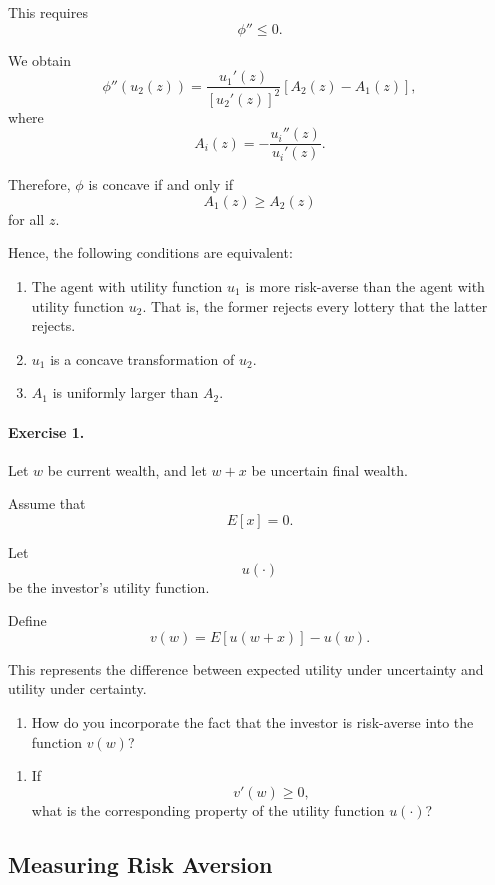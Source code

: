 This requires
\[
\phi''\le 0.
\]

We obtain
\[
\phi''(u_2(z))
=
\frac{u_1'(z)}{[u_2'(z)]^2}
\left[
A_2(z)-A_1(z)
\right],
\]
where
\[
A_i(z)
=
-\frac{u_i''(z)}{u_i'(z)}.
\]

Therefore, \(\phi\) is concave if and only if
\[
A_1(z)\ge A_2(z)
\]
for all \(z\).

Hence, the following conditions are equivalent:

\begin{enumerate}
    \item The agent with utility function \(u_1\) is more risk-averse than the agent with utility function \(u_2\). That is, the former rejects every lottery that the latter rejects.
    
    \item \(u_1\) is a concave transformation of \(u_2\).
    
    \item \(A_1\) is uniformly larger than \(A_2\).
\end{enumerate}

\paragraph{Exercise 1.}
Let \(w\) be current wealth, and let \(w+x\) be uncertain final wealth.

Assume that
\[
E[x]=0.
\]

Let
\[
u(\cdot)
\]
be the investor's utility function.

Define
\[
v(w)
=
E[u(w+x)]-u(w).
\]

This represents the difference between expected utility under uncertainty and utility under certainty.

\begin{enumerate}
    \item[(i)] How do you incorporate the fact that the investor is risk-averse into the function \(v(w)\)?
\end{enumerate}



\begin{enumerate}
    \item[(ii)] If
    \[
    v'(w)\ge 0,
    \]
    what is the corresponding property of the utility function \(u(\cdot)\)?
\end{enumerate}

\subsection{Measuring Risk Aversion}


